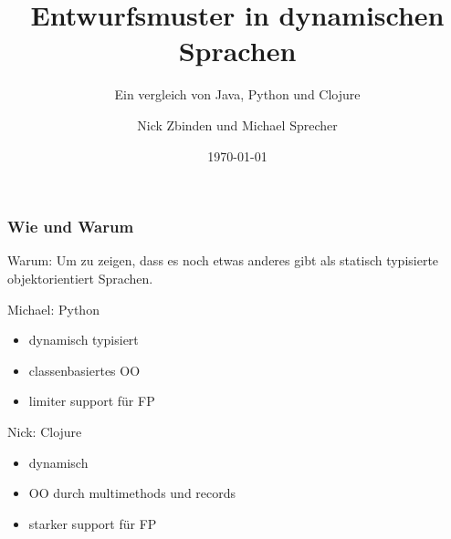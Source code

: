 \documentclass[compress, blue]{beamer}
\begin{document}
\title{Entwurfsmuster in dynamischen Sprachen}
\subtitle{Ein vergleich von Java, Python und Clojure}
\author{Nick Zbinden und Michael Sprecher}
\date{\today}

\begin{frame}
  \titlepage
\end{frame}

\begin{frame}\frametitle{Wie und Warum}
\begin{center}

\begin{block}{Warum:}
  Um zu zeigen, dass es noch etwas anderes gibt als statisch
  typisierte objektorientiert Sprachen.
\end{block}


\begin{block}{Michael: Python}
  \begin{itemize}
    \item dynamisch typisiert
    \item classenbasiertes OO
    \item limiter support für FP
  \end{itemize}
\end{block} 

\begin{block}{Nick: Clojure}
  \begin{itemize}
    \item dynamisch
    \item OO durch multimethods und records
    \item starker support für FP
  \end{itemize}
\end{block}

\end{center}
\end{frame}
\end{document}
